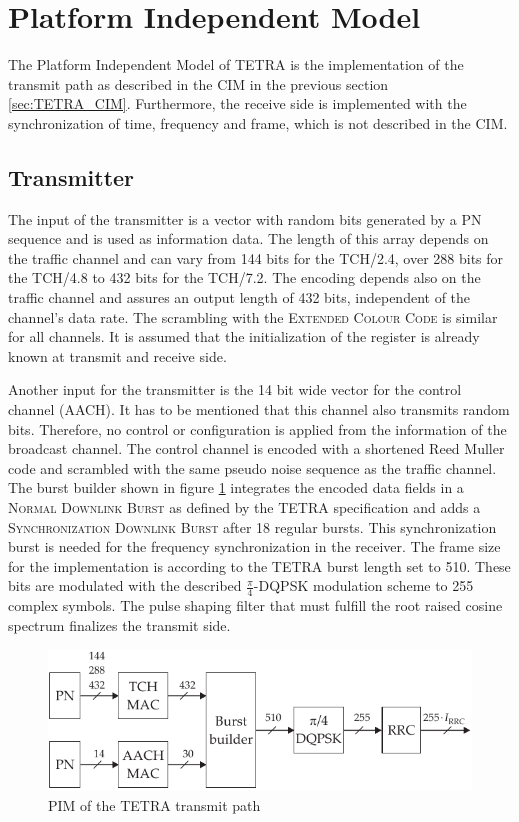 \section{Platform Independent Model}
\label{sec:PIM_TETRA}
The Platform Independent Model of TETRA is the implementation of the transmit path as described in the \ac{CIM} in the previous section \ref{sec:TETRA_CIM}. Furthermore, the receive side is implemented with the synchronization of time, frequency and frame, which is not described in the \ac{CIM}.

\subsection{Transmitter}
The input of the transmitter is a vector with random bits generated by a \ac{PN} sequence and is used as information data. The length of this array depends on the traffic channel and can vary from 144 bits for the TCH/2.4, over 288 bits for the TCH/4.8 to 432 bits for the TCH/7.2. The encoding depends also on the traffic channel and assures an output length of 432 bits, independent of the channel's data rate. The scrambling with the \textsc{Extended Colour Code} is similar for all channels. It is assumed that the initialization of the register is already known at transmit and receive side.

Another input for the transmitter is the 14 bit wide vector for the control channel (AACH). It has to be mentioned that this channel also transmits random bits. Therefore, no control or configuration is applied from the information of the broadcast channel. The control channel is encoded with a shortened Reed Muller code and scrambled with the same pseudo noise sequence as the traffic channel. The burst builder shown in figure \ref{fig:PIM_Tx} integrates the encoded data fields in a \textsc{Normal Downlink Burst} as defined by the TETRA specification and adds a \textsc{Synchronization Downlink Burst} after 18 regular bursts. This synchronization burst is needed for the frequency synchronization in the receiver. The frame size for the implementation is according to the TETRA burst length set to 510. These bits are modulated with the described $\frac{\pi}{4}$-\ac{DQPSK} modulation scheme to 255 complex symbols. The pulse shaping filter that must fulfill the root raised cosine spectrum finalizes the transmit side. 

\begin{figure}[htb]
	\centering
		\includegraphics[width=1.00\textwidth]{../kapitel04/figures/PIM_Tx.pdf}
	\caption{PIM of the TETRA transmit path}
	\label{fig:PIM_Tx}
\end{figure}


